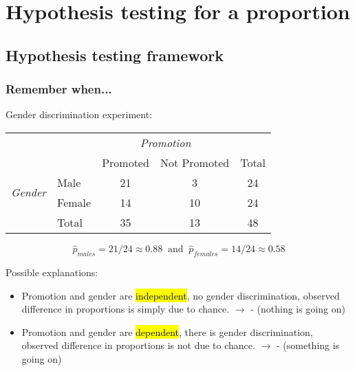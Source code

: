 
\section{Hypothesis testing for a proportion}


\subsection{Hypothesis testing framework}


\begin{frame}
\frametitle{Remember when...}

Gender discrimination experiment:

{\footnotesize
\begin{tabular}{ll  cc c} 
  		&				& \multicolumn{2}{c}{\textit{Promotion}} \\
\cline{3-4}
							&			& Promoted	& Not Promoted 	& Total	\\
\cline{2-5}
\multirow{2}{*}{\textit{Gender	}}	&Male 		& 21	 	& 3		& 24 	\\
							&Female		& 14	 	& 10 	 	& 24 \\
\cline{2-5}
							&Total		& 35		& 13		& 48 \\
\end{tabular}
}

\pause

\[ \hat{p}_{males} = 21 / 24 \approx 0.88 ~ \text{ and } ~ \hat{p}_{females} = 14 / 24 \approx 0.58 \]

\pause

Possible explanations:
\begin{itemize}
\item Promotion and gender are \hl{independent}, no gender discrimination, observed difference in proportions is simply due to chance. $\rightarrow$  - {\small (nothing is going on)}
\item Promotion and gender are \hl{dependent}, there is gender discrimination, observed difference in proportions is not due to chance. $\rightarrow$  - {\small (something is going on)}

\end{itemize}

\end{frame}

